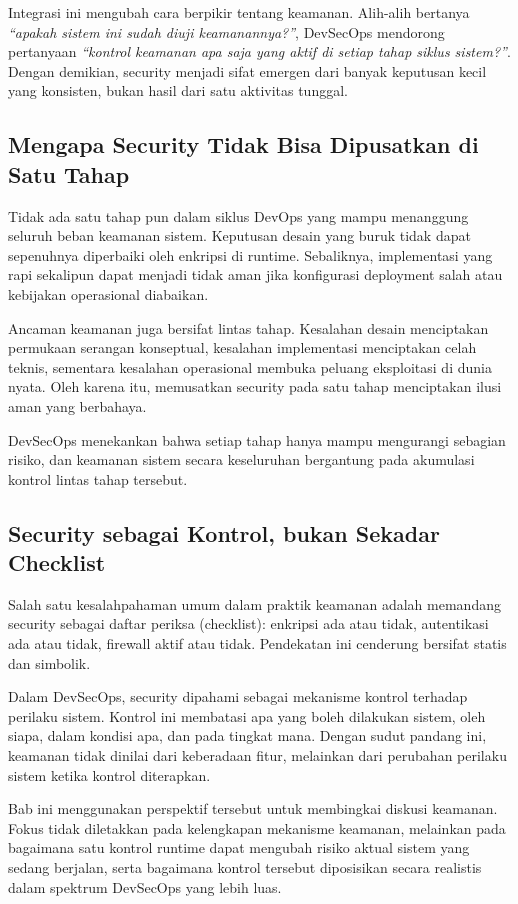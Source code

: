 Integrasi ini mengubah cara berpikir tentang keamanan. Alih-alih bertanya \emph{“apakah sistem ini sudah diuji keamanannya?”}, DevSecOps mendorong pertanyaan \emph{“kontrol keamanan apa saja yang aktif di setiap tahap siklus sistem?”}. Dengan demikian, security menjadi sifat emergen dari banyak keputusan kecil yang konsisten, bukan hasil dari satu aktivitas tunggal.

\subsection[Mengapa Security Tidak Bisa Dipusatkan]{Mengapa Security Tidak Bisa Dipusatkan di Satu Tahap}

Tidak ada satu tahap pun dalam siklus DevOps yang mampu menanggung seluruh beban keamanan sistem. Keputusan desain yang buruk tidak dapat sepenuhnya diperbaiki oleh enkripsi di runtime. Sebaliknya, implementasi yang rapi sekalipun dapat menjadi tidak aman jika konfigurasi deployment salah atau kebijakan operasional diabaikan.

Ancaman keamanan juga bersifat lintas tahap. Kesalahan desain menciptakan permukaan serangan konseptual, kesalahan implementasi menciptakan celah teknis, sementara kesalahan operasional membuka peluang eksploitasi di dunia nyata. Oleh karena itu, memusatkan security pada satu tahap menciptakan ilusi aman yang berbahaya.

DevSecOps menekankan bahwa setiap tahap hanya mampu mengurangi sebagian risiko, dan keamanan sistem secara keseluruhan bergantung pada akumulasi kontrol lintas tahap tersebut.

\subsection{Security sebagai Kontrol, bukan Sekadar Checklist}

Salah satu kesalahpahaman umum dalam praktik keamanan adalah memandang security sebagai daftar periksa (checklist): enkripsi ada atau tidak, autentikasi ada atau tidak, firewall aktif atau tidak. Pendekatan ini cenderung bersifat statis dan simbolik.

Dalam DevSecOps, security dipahami sebagai mekanisme kontrol terhadap perilaku sistem. Kontrol ini membatasi apa yang boleh dilakukan sistem, oleh siapa, dalam kondisi apa, dan pada tingkat mana. Dengan sudut pandang ini, keamanan tidak dinilai dari keberadaan fitur, melainkan dari perubahan perilaku sistem ketika kontrol diterapkan.

Bab ini menggunakan perspektif tersebut untuk membingkai diskusi keamanan. Fokus tidak diletakkan pada kelengkapan mekanisme keamanan, melainkan pada bagaimana satu kontrol runtime dapat mengubah risiko aktual sistem yang sedang berjalan, serta bagaimana kontrol tersebut diposisikan secara realistis dalam spektrum DevSecOps yang lebih luas.


